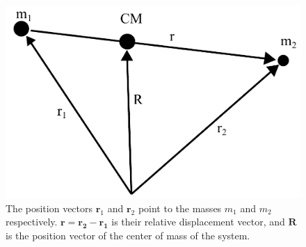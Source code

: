 \documentclass[english, oneside]{HYgradu}
\begin{document}
\begin{figure}[h!tb]
\centering
\includegraphics[scale=0.5]{../images/2bp.pdf}
\caption{The position vectors $\mathbf{r}_1$ and $\mathbf{r}_2$ point to the masses $m_1$ and $m_2$ respectively. $\mbox{$\mathbf{r} = \mathbf{r_2} - \mathbf{r_1}$}$ is their relative displacement vector, and $\mathbf{R}$ is the position vector of the center of mass of the system.}
\label{fig:2BodyProb}
\end{figure}
\end{document}
